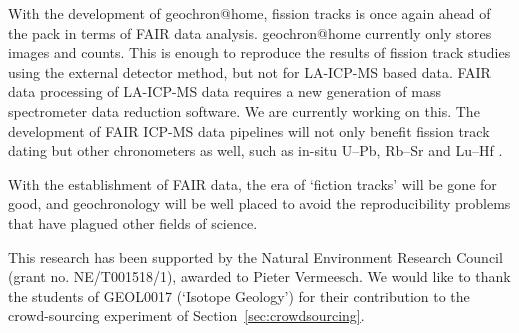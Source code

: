 \documentclass[gchron, manuscript]{copernicus}
\begin{document}
With the development of geochron@home, fission tracks is once
again ahead of the pack in terms of FAIR data analysis.
geochron@home currently only stores images and counts. This
is enough to reproduce the results of fission track studies using the
external detector method, but not for LA-ICP-MS based data. FAIR data
processing of LA-ICP-MS data requires a new generation of mass
spectrometer data reduction software. We are currently working on
this. The development of FAIR ICP-MS data pipelines will not only
benefit fission track dating but other chronometers as well, such as
in-situ U--Pb, Rb--Sr and Lu--Hf \citep{vermeesch2025}.\medskip

With the establishment of FAIR data, the era of `fiction tracks' will
be gone for good, and geochronology will be well placed to avoid the
reproducibility problems that have plagued other fields of science.







\begin{acknowledgements}
This research has been supported by the Natural Environment Research
Council (grant no. NE/T001518/1), awarded to Pieter Vermeesch. We would like
to thank the students of GEOL0017 (`Isotope Geology') for their contribution
to the crowd-sourcing experiment of Section~\ref{sec:crowdsourcing}.
\end{acknowledgements}



\end{document}
